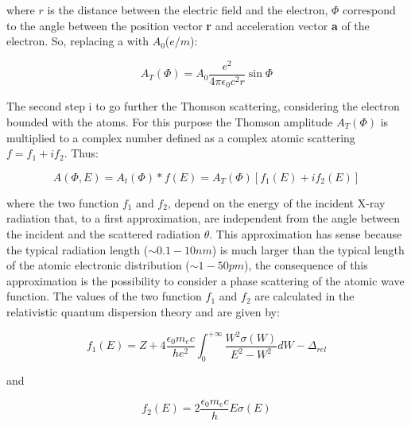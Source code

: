 \begin{flushleft}
where $r $ is the distance between the electric field and the electron, $\Phi $ correspond to the angle between the position vector \textbf{r} and acceleration vector \textbf{a} of the electron. So, replacing a with $A_0 $($e / m $):
\end{flushleft}

\begin{equation}
A_T(\Phi) = A_0 \frac{e^2}{4 \pi \epsilon_0 c^2 r} \sin \Phi
\label{eq: At2}
\end{equation}

\begin{flushleft}
The second step i to go further the Thomson scattering, considering the electron bounded with the atoms. For this purpose the Thomson amplitude $A_T (\Phi) $ is multiplied to a complex number defined as a complex atomic scattering $f = f_1 + if_2 $. Thus:
\end{flushleft}

\begin{equation}
A(\Phi, E) = A_t(\Phi) * f(E) = A_T(\Phi) [f_1(E) + if_2(E)]
\label{eq: A(fi, E)}
\end{equation}

\begin{flushleft}
where the two function $f_1 $ and $f_2 $, depend on the energy of the incident X-ray radiation that, to a first approximation, are independent from the angle between the incident and the scattered radiation $\theta $. This approximation has sense because the typical radiation length ($\sim 0.1-10nm $) is much larger than the typical length of the atomic electronic distribution ($\sim 1-50pm $), the consequence of this approximation is the possibility to consider a phase scattering of the atomic wave function. The values of the two function  $f_1 $ and $f_2 $ are calculated in the relativistic quantum dispersion theory and are given by:
\end{flushleft}

\begin{equation}
f_1(E) = Z + 4 \frac{\epsilon_0 m_e c}{h e^2} \int_{0}^{+ \infty}\frac{W^2 \sigma(W)}{E^2 - W^2} dW - \Delta_{rel}
\label{eq: f1}
\end{equation}

\begin{flushleft}
and
\end{flushleft}

\begin{equation}
f_2(E) = 2 \frac{\epsilon_0 m_e c}{h} E \sigma(E)
\label{eq: f2}
\end{equation}

